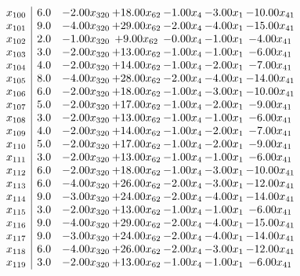 \documentclass[8pt]{article}
\begin{document}
\[\begin{array}{c| c c@{\hskip 2pt} c@{\hskip 2pt} c@{\hskip 2pt} c@{\hskip 2pt} c@{\hskip 2pt} }
 x_{100}   &  6.0 & -2.00 x_{320} & + 18.00 x_{62} & -1.00 x_{4} & -3.00 x_{1} & -10.00 x_{41}\\
 x_{101}   &  9.0 & -4.00 x_{320} & + 29.00 x_{62} & -2.00 x_{4} & -4.00 x_{1} & -15.00 x_{41}\\
 x_{102}   &  2.0 & -1.00 x_{320} & +  9.00 x_{62} & -0.00 x_{4} & -1.00 x_{1} & -4.00 x_{41}\\
 x_{103}   &  3.0 & -2.00 x_{320} & + 13.00 x_{62} & -1.00 x_{4} & -1.00 x_{1} & -6.00 x_{41}\\
 x_{104}   &  4.0 & -2.00 x_{320} & + 14.00 x_{62} & -1.00 x_{4} & -2.00 x_{1} & -7.00 x_{41}\\
 x_{105}   &  8.0 & -4.00 x_{320} & + 28.00 x_{62} & -2.00 x_{4} & -4.00 x_{1} & -14.00 x_{41}\\
 x_{106}   &  6.0 & -2.00 x_{320} & + 18.00 x_{62} & -1.00 x_{4} & -3.00 x_{1} & -10.00 x_{41}\\
 x_{107}   &  5.0 & -2.00 x_{320} & + 17.00 x_{62} & -1.00 x_{4} & -2.00 x_{1} & -9.00 x_{41}\\
 x_{108}   &  3.0 & -2.00 x_{320} & + 13.00 x_{62} & -1.00 x_{4} & -1.00 x_{1} & -6.00 x_{41}\\
 x_{109}   &  4.0 & -2.00 x_{320} & + 14.00 x_{62} & -1.00 x_{4} & -2.00 x_{1} & -7.00 x_{41}\\
 x_{110}   &  5.0 & -2.00 x_{320} & + 17.00 x_{62} & -1.00 x_{4} & -2.00 x_{1} & -9.00 x_{41}\\
 x_{111}   &  3.0 & -2.00 x_{320} & + 13.00 x_{62} & -1.00 x_{4} & -1.00 x_{1} & -6.00 x_{41}\\
 x_{112}   &  6.0 & -2.00 x_{320} & + 18.00 x_{62} & -1.00 x_{4} & -3.00 x_{1} & -10.00 x_{41}\\
 x_{113}   &  6.0 & -4.00 x_{320} & + 26.00 x_{62} & -2.00 x_{4} & -3.00 x_{1} & -12.00 x_{41}\\
 x_{114}   &  9.0 & -3.00 x_{320} & + 24.00 x_{62} & -2.00 x_{4} & -4.00 x_{1} & -14.00 x_{41}\\
 x_{115}   &  3.0 & -2.00 x_{320} & + 13.00 x_{62} & -1.00 x_{4} & -1.00 x_{1} & -6.00 x_{41}\\
 x_{116}   &  9.0 & -4.00 x_{320} & + 29.00 x_{62} & -2.00 x_{4} & -4.00 x_{1} & -15.00 x_{41}\\
 x_{117}   &  9.0 & -3.00 x_{320} & + 24.00 x_{62} & -2.00 x_{4} & -4.00 x_{1} & -14.00 x_{41}\\
 x_{118}   &  6.0 & -4.00 x_{320} & + 26.00 x_{62} & -2.00 x_{4} & -3.00 x_{1} & -12.00 x_{41}\\
 x_{119}   &  3.0 & -2.00 x_{320} & + 13.00 x_{62} & -1.00 x_{4} & -1.00 x_{1} & -6.00 x_{41}\\

\end{array}\]
\end{document}
